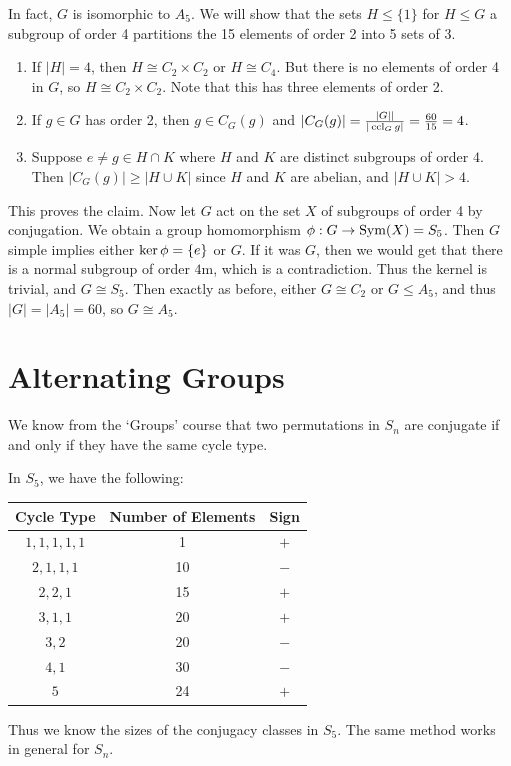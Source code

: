 \documentclass[a4paper]{scrartcl}
\begin{document}
\begin{example}
In fact, $G$ is isomorphic to $A_5$. We will show that the sets $H \leq \{1\}$ for $H \leq G$ a subgroup of order 4 partitions the 15 elements of order 2 into 5 sets of 3. 
\begin{enumerate}
	\item If $|H| = 4$, then $H \cong C_2 \times C_2$ or $H \cong C_4$. But there is no elements of order 4 in $G$, so $H \cong C_2 \times C_2$. Note that this has three elements of order 2.
	\item If $g \in G$ has order 2, then $g \in C_G(g)$ and $|C_G(g)| = \frac{|G||}{|\operatorname{ccl}_G{g}|} = \frac{60}{15} = 4$.
	\item Suppose $e \neq g \in H \cap K$ where $H$ and $K$ are distinct subgroups of order $4$. Then $|C_G(g)| \geq |H \cup K|$ since $H$ and $K$ are abelian, and $|H \cup K| > 4$.
\end{enumerate}
This proves the claim. Now let $G$ act on the set $X$ of subgroups of order 4 by conjugation. We obtain a group homomorphism $\phi:G \rightarrow \operatorname{Sym}(X) = S_5$. Then $G$ simple implies either $\operatorname{ker} \phi = \{e\}$ or $G$. If it was $G$, then we would get that there is a normal subgroup of order $4$m, which is a contradiction. Thus the kernel is trivial, and $G \cong S_5$. Then exactly as before, either $G \cong C_2$ or $G \leq A_5$, and thus $|G| = |A_5| = 60$, so $G \cong A_5$.  
\end{example}

\section{Alternating Groups}

We know from the `Groups' course that two permutations in $S_n$ are conjugate if and only if they have the same cycle type.

\begin{example}
	In $S_5$, we have the following:
	\begin{center}
		\begin{tabular}{@{}ccc@{}}
			\toprule
			Cycle Type    & Number of Elements & Sign \\ \midrule
			$1, 1, 1, 1, 1$  & 1   &   $+$  \\ 
			$2, 1, 1, 1$  & 10   &   $-$  \\
			$2, 2, 1$  & 15   &   $+$  \\
			$3, 1, 1$  & 20   &   $+$  \\
			$3, 2$  & 20   &   $-$  \\
			$4, 1$  & 30   &   $-$  \\
			$5$  & 24   &   $+$  \\
			\bottomrule
			\end{tabular}
	\end{center}
	Thus we know the sizes of the conjugacy classes in $S_5$. The same method works in general for $S_n$.
\end{example}
\end{document}
